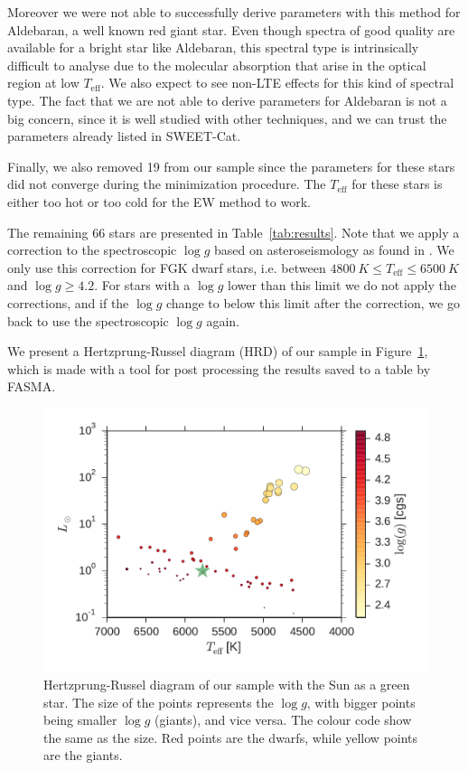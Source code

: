 \documentclass{aa}
\begin{document}
Moreover we were not able to successfully derive parameters with this method for
Aldebaran, a well known red giant star. Even though spectra of good quality are
available for a bright star like Aldebaran, this spectral type is intrinsically
difficult to analyse due to the molecular absorption that arise in the optical
region at low $T_\mathrm{eff}$. We also expect to see non-LTE effects for this
kind of spectral type. The fact that we are not able to derive parameters for
Aldebaran is not a big concern, since it is well studied with other techniques,
and we can trust the parameters already listed in SWEET-Cat.

Finally, we also removed 19 from our sample since the parameters for these stars
did not converge during the minimization procedure. The $T_\mathrm{eff}$ for
these stars is either too hot or too cold for the EW method to work.

The remaining 66 stars are presented in Table~\ref{tab:results}. Note that we
apply a correction to the spectroscopic $\log g$ based on asteroseismology as
found in \citet{Mortier2014}. We only use this correction for FGK dwarf stars,
i.e. between $\SI{4800}{K}\leq T_\mathrm{eff} \leq \SI{6500}{K}$ and $\log
g\geq4.2$. For stars with a $\log g$ lower than this limit we do not apply the
corrections, and if the $\log g$ change to below this limit after the
correction, we go back to use the spectroscopic $\log g$ again.

We present a Hertzprung-Russel diagram (HRD) of our sample in
Figure~\ref{fig:HRD}, which is made with a tool for post processing the results
saved to a table by FASMA.

\begin{figure}[tpb]
    \centering
    \includegraphics[width=1.0\linewidth,natwidth=440,natheight=290]{figures/HR.pdf}
    \caption{Hertzprung-Russel diagram of our sample with the Sun as a green
    star. The size of the points represents the $\log g$, with bigger points
    being smaller $\log g$ (giants), and vice versa. The colour code show the
    same as the size. Red points are the dwarfs, while yellow points are the
    giants.}
    \label{fig:HRD}
\end{figure}
\end{document}
